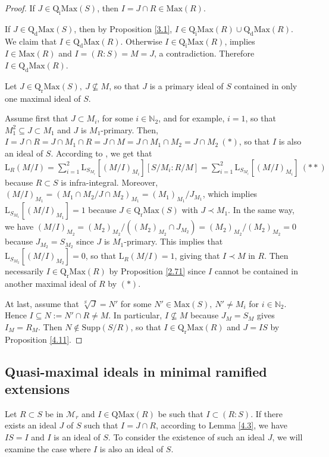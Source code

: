 \documentclass[12pt,leqno]{amsart}
\theoremstyle{definition}
\begin{document}
\begin{proof} If $J\in\mathrm{Q_iMax}(S)$, then $I =J\cap R\in\mathrm {Max}(R)$. 

If $J\in\mathrm{Q_dMax}(S)$, then by Proposition \ref{3.1}, $I\in\mathrm {Q_iMax}(R)\cup\mathrm{Q_dMax} (R)$. We claim that $I\in\mathrm {Q_dMax}(R)$. Otherwise $I\in\mathrm{Q_iMax}(R)$, implies $I\in\mathrm {Max}(R)$ and $I=(R:S)=M=J$, a contradiction. Therefore $I\in\mathrm {Q_dMax}(R)$. 
 
Let $J\in\mathrm{Q_rMax}(S),\ J\not\subseteq M$, so that $J$ is a primary ideal of $S$ contained in only one maximal ideal of $S$.  

Assume first that $J\subset M_i$, for some $i\in\mathbb N_2$, and for example, $i=1$, so that $M_1^2\subseteq J\subset M_1$ and $J$ is $M_1 $-primary. Then, $I=J\cap R=J\cap M_1\cap R=J\cap M=J\cap M_1\cap M _2=J\cap M_2\ (*)$, so that $I$ is also an ideal of $S$. According to \cite[Theorem 13, p. 168]{N}, we get that $\mathrm{L}_R(M/I)=\sum_{i=1}^ 2\mathrm{L}_{S_{M_i}}[(M/I)_{M_i}][S/M_i:R/M]=\sum_{i=1}^2\mathrm{L}_ {S_{M_i}}[(M/I)_{M_i}]\ (**)$ because $R\subset S$ is infra-integral. Moreover, $(M/I)_{M_1}=(M_1\cap M_2/J\cap M_2)_{M_1}=(M_1)_{M_1}/J _{M_1}$, which implies $\mathrm{L}_{S_{M_1}}[(M/I)_{M_1}]=1$ because $J\in\mathrm{Q_rMax}(S)$ with $J\prec M_1$. In the same way, we have $(M/I)_{M_2}=(M_2)_{M_2}/((M_ 2)_{M_2}\cap J_{M_2})=(M_2)_{M_2}/(M_ 2)_{M_2}=0$ because $J_{M_2}=S_{M_2}$ since $J$ is $M_1$-primary. This implies that $\mathrm{L}_{S_{M_2}}[(M/I)_{M_2}]=0$, so that $\mathrm{L}_R(M/I)=1$, giving that $I\prec M$ in $R$. Then necessarily $I\in\mathrm{Q_rMax}(R)$ by Proposition \ref{2.71} since $I$ cannot be contained in another maximal ideal of $R$ by $(*)$.

At last, assume that $\sqrt[S]J=N'$ for some $N'\in\mathrm{Max}(S),\ N' \neq M_i$ for $i\in\mathbb N_2$. Hence $I\subseteq N:=N'\cap R\neq M$. In particular, $I\not\subseteq M$ because $J_M=S_M$ gives $I_M=R_M$. Then $N\not\in\mathrm{Supp}(S/R)$, so that $I\in\mathrm{Q_rMax}(R)$ and $J=IS$ by Proposition \ref{4.11}. 
\end{proof}

\subsection{Quasi-maximal ideals in minimal ramified   extensions}

Let $R\subset S$ be in $\mathcal M_r$ and $I\in\mathrm{QMax}(R)$ be such that $I\subset (R:S)$. If there exists an ideal $J$ of $S$ such that $I= J\cap R$, according to Lemma \ref{4.3}, we have $IS=I$ and $I$ is an ideal of $S$. To consider the existence of such an ideal $J$, we will examine the case where $I$ is also an ideal of $S$.
\end{document}
